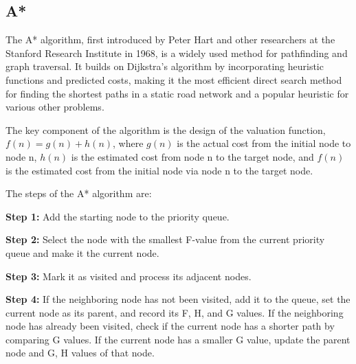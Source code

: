 \documentclass[bibliography=totoc]{scrartcl}
\begin{document}
\subsection{A*}



The A* algorithm, first introduced by Peter Hart and other researchers at the Stanford Research Institute in 1968, is a widely used method for pathfinding and graph traversal. \cite{4082128} It builds on Dijkstra's algorithm by incorporating heuristic functions and predicted costs, making it the most efficient direct search method for finding the shortest paths in a static road network and a popular heuristic for various other problems.\cite{ProbabilisticApproachCollaborativeMultiRobotLocalization}







The key component of the algorithm is the design of the valuation function, $f(n) = g(n) + h(n)$, where $g(n)$ is the actual cost from the initial node to node n, $h(n)$ is the estimated cost from node n to the target node, and $f(n)$ is the estimated cost from the initial node via node n to the target node.







The steps of the A* algorithm are:







\textbf{Step 1:} Add the starting node to the priority queue.







\textbf{Step 2:} Select the node with the smallest F-value from the current priority queue and make it the current node.







\textbf{Step 3:} Mark it as visited and process its adjacent nodes.







\textbf{Step 4:} If the neighboring node has not been visited, add it to the queue, set the current node as its parent, and record its F, H, and G values. If the neighboring node has already been visited, check if the current node has a shorter path by comparing G values. If the current node has a smaller G value, update the parent node and G, H values of that node.
\end{document}
